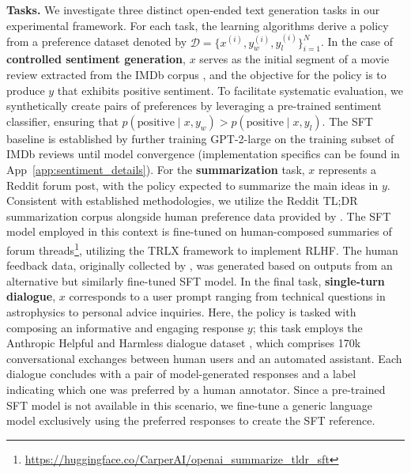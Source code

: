\textbf{Tasks.} We investigate three distinct open-ended text generation tasks in our experimental framework. For each task, the learning algorithms derive a policy from a preference dataset denoted by $\mathcal{D}=\bigl\{x^{(i)}, y_w^{(i)}, y_l^{(i)}\bigr\}_{i=1}^N$. In the case of \textbf{controlled sentiment generation}, $x$ serves as the initial segment of a movie review extracted from the IMDb corpus \cite{maas-EtAl:2011:ACL-HLT2011}, and the objective for the policy is to produce $y$ that exhibits positive sentiment. To facilitate systematic evaluation, we synthetically create pairs of preferences by leveraging a pre-trained sentiment classifier, ensuring that $p(\text{positive}\mid x,y_w)>p(\text{positive}\mid x,y_l)$. The SFT baseline is established by further training GPT-2-large on the training subset of IMDb reviews until model convergence (implementation specifics can be found in App~\ref{app:sentiment_details}). For the \textbf{summarization} task, $x$ represents a Reddit forum post, with the policy expected to summarize the main ideas in $y$. Consistent with established methodologies, we utilize the Reddit TL;DR summarization corpus \citep{volske-etal-2017-tl} alongside human preference data provided by \citeauthor{stiennon2022learning}. The SFT model employed in this context is fine-tuned on human-composed summaries of forum threads\footnote{\url{https://huggingface.co/CarperAI/openai_summarize_tldr_sft}}, utilizing the TRLX framework \citep{leandro_von_werra_2023_7790115} to implement RLHF. The human feedback data, originally collected by \citeauthor{stiennon2022learning}, was generated based on outputs from an alternative but similarly fine-tuned SFT model. In the final task, \textbf{single-turn dialogue}, $x$ corresponds to a user prompt ranging from technical questions in astrophysics to personal advice inquiries. Here, the policy is tasked with composing an informative and engaging response $y$; this task employs the Anthropic Helpful and Harmless dialogue dataset \citep{bai2022training}, which comprises 170k conversational exchanges between human users and an automated assistant. Each dialogue concludes with a pair of model-generated responses and a label indicating which one was preferred by a human annotator. Since a pre-trained SFT model is not available in this scenario, we fine-tune a generic language model exclusively using the preferred responses to create the SFT reference.

